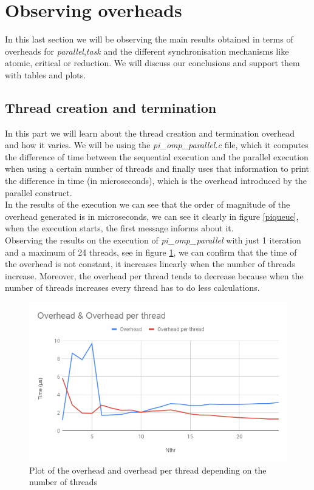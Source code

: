 \documentclass[12]{article}
\begin{document}
\section{Observing overheads}

In this last section we will be observing the main results obtained in terms of overheads for \textit{parallel},\textit{task} and the different synchronisation mechanisms like atomic, critical or reduction. We will discuss our conclusions and support them with tables and plots.

\subsection{Thread creation and termination}
In this part we will learn about the thread creation and termination overhead and how it varies. We will be using the \textit{pi\_omp\_parallel.c} file, which it computes the difference of time between the sequential execution and the parallel execution when using a certain number of threads and finally uses that information to print the difference in time (in microseconds), which is the overhead introduced by the parallel construct. 
\\
\medskip
In the results of the execution we can see that the order of magnitude of the overhead generated is in microseconds, we can see it clearly in figure \ref{piqueue}, when the execution starts, the first message informs about it. 
\\
Observing the results on the execution of \textit{pi\_omp\_parallel} with just 1 iteration and a maximum of 24 threads, see in figure \ref{overheadplot1}, we can confirm that the time of the overhead is not constant, it increases linearly when the number of threads increase. Moreover, the overhead per thread tends to decrease because when the number of threads increases every thread has to do less calculations.

\begin{figure}[H]
\centering
\includegraphics[scale=0.5]{images/thread.png}
\caption{Plot of the overhead and overhead per thread depending on the number of threads}
\label{overheadplot1}
\end{figure}
\end{document}
